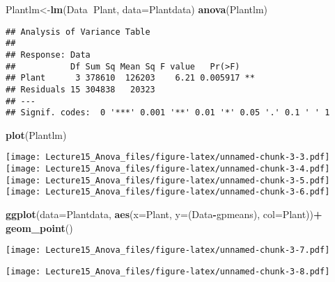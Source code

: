 \documentclass[]{article}
\newenvironment{Shaded}{\begin{snugshade}}{\end{snugshade}}
\newcommand{\KeywordTok}[1]{\textcolor[rgb]{0.13,0.29,0.53}{\textbf{#1}}}
\newcommand{\DataTypeTok}[1]{\textcolor[rgb]{0.13,0.29,0.53}{#1}}
\newcommand{\StringTok}[1]{\textcolor[rgb]{0.31,0.60,0.02}{#1}}
\newcommand{\OperatorTok}[1]{\textcolor[rgb]{0.81,0.36,0.00}{\textbf{#1}}}
\newcommand{\NormalTok}[1]{#1}
\begin{document}
\begin{Shaded}
\begin{Highlighting}[]
\NormalTok{Plantlm<-}\KeywordTok{lm}\NormalTok{(Data}\OperatorTok{~}\NormalTok{Plant, }\DataTypeTok{data=}\NormalTok{Plantdata)}
\KeywordTok{anova}\NormalTok{(Plantlm)}
\end{Highlighting}
\end{Shaded}

\begin{verbatim}
## Analysis of Variance Table
## 
## Response: Data
##           Df Sum Sq Mean Sq F value   Pr(>F)   
## Plant      3 378610  126203    6.21 0.005917 **
## Residuals 15 304838   20323                    
## ---
## Signif. codes:  0 '***' 0.001 '**' 0.01 '*' 0.05 '.' 0.1 ' ' 1
\end{verbatim}

\begin{Shaded}
\begin{Highlighting}[]
\KeywordTok{plot}\NormalTok{(Plantlm)}
\end{Highlighting}
\end{Shaded}

\texttt{[image: Lecture15\_Anova\_files/figure-latex/unnamed-chunk-3-3.pdf]}
\texttt{[image: Lecture15\_Anova\_files/figure-latex/unnamed-chunk-3-4.pdf]}
\texttt{[image: Lecture15\_Anova\_files/figure-latex/unnamed-chunk-3-5.pdf]}
\texttt{[image: Lecture15\_Anova\_files/figure-latex/unnamed-chunk-3-6.pdf]}

\begin{Shaded}
\begin{Highlighting}[]
\KeywordTok{ggplot}\NormalTok{(}\DataTypeTok{data=}\NormalTok{Plantdata, }\KeywordTok{aes}\NormalTok{(}\DataTypeTok{x=}\NormalTok{Plant, }\DataTypeTok{y=}\NormalTok{(Data}\OperatorTok{-}\NormalTok{gpmeans), }\DataTypeTok{col=}\NormalTok{Plant))}\OperatorTok{+}
\StringTok{    }\KeywordTok{geom_point}\NormalTok{()}
\end{Highlighting}
\end{Shaded}

\texttt{[image: Lecture15\_Anova\_files/figure-latex/unnamed-chunk-3-7.pdf]}

\begin{Shaded}
\end{Shaded}

\texttt{[image: Lecture15\_Anova\_files/figure-latex/unnamed-chunk-3-8.pdf]}
\end{document}

